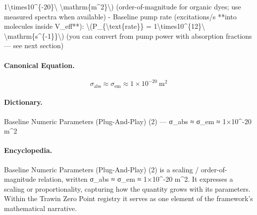 1\textbackslash{}times10\textasciicircum{}\{-20\}\textbackslash{} \textbackslash{}mathrm\{m\textasciicircum{}2\}\textbackslash{}) (order-of-magnitude for organic dyes; use measured spectra when available) - Baseline pump rate (excitations/s **into molecules inside V\_eff**): \textbackslash{}(P\_\{\textbackslash{}text\{rate\}\} = 1\textbackslash{}times10\textasciicircum{}\{12\}\textbackslash{} \textbackslash{}mathrm\{s\textasciicircum{}\{-1\}\}\textbackslash{}) (you can convert from pump power with absorption fractions — see next section)

\paragraph{Canonical Equation.}
\[
\sigma_{\text{abs}} \approx \sigma_{\text{em}} \approx 1\times10^{-20}\ \mathrm{m^2}
\]

\paragraph{Dictionary.}
Baseline Numeric Parameters (Plug-And-Play) (2) — σ\_abs ≈ σ\_em ≈ 1×10\textasciicircum{}-20 m\textasciicircum{}2

\paragraph{Encyclopedia.}
Baseline Numeric Parameters (Plug-And-Play) (2) is a scaling / order-of-magnitude relation, written σ\_abs ≈ σ\_em ≈ 1×10\textasciicircum{}-20 m\textasciicircum{}2. It expresses a scaling or proportionality, capturing how the quantity grows with its parameters. Within the Trawin Zero Point registry it serves as one element of the framework's mathematical narrative.
